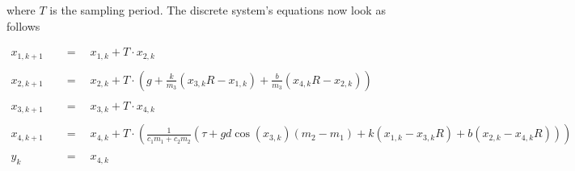 \documentclass{article}
\begin{document}
where \(T\) is the sampling period. The discrete system's equations now look as follows

\[
\begin{aligned}
x_{1,k+1}\quad &=\quad x_{1,k} + T\cdot  x_{2,k} \\\\
x_{2,k+1}\quad &=\quad x_{2,k} + T\cdot \left( g + \frac{k}{m_3} (x_{3,k} R - x_{1,k}) + \frac{b}{m_3} (x_{4,k} R - x_{2,k}) \right) \\\\
x_{3,k+1}\quad &=\quad x_{3,k} + T\cdot x_{4,k} \\\\
x_{4,k+1}\quad &=\quad x_{4,k} + T\cdot \left( \frac{1}{c_1 m_1 + c_2 m_2} \left( \tau + gd\cos(x_{3,k})(m_2 - m_1) + k(x_{1,k} - x_{3,k} R) + b(x_{2,k} - x_{4,k}R) \right) \right) \\\\
y_k\quad &=\quad x_{4,k}
\end{aligned}
\]
\end{document}
